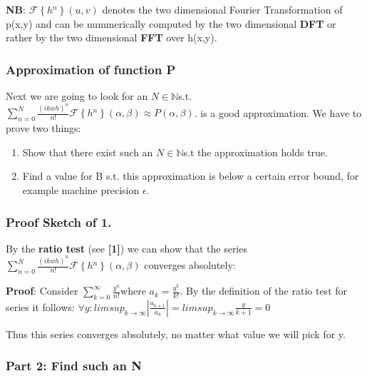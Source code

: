 \textbf{NB}: $\mathcal{F}\left\{ h{}^{n}\right\} (u,v)$ denotes the
two dimensional Fourier Transformation of p(x,y) and can be nummerically
computed by the two dimensional \textbf{DFT} or rather by the two
dimensional \textbf{FFT} over h(x,y). 


\subsubsection{Approximation of function P}

Next we are going to look for an $N\mathbb{\in N}$s.t. $\sum_{n=0}^{N}\frac{(ikwh)^{n}}{n!}\mathcal{F}\left\{ h{}^{n}\right\} (\alpha,\beta)\approx P(\alpha,\beta)$.
is a good approximation. We have to prove two things:
\begin{enumerate}
\item Show that there exist such an $N\mathbb{\in N}$s.t the approximation
holds true.
\item Find a value for B s.t. this approximation is below a certain error
bound, for example machine precision $\epsilon$. 
\end{enumerate}

\subsubsection{Proof Sketch of 1.}

By the \textbf{ratio test} (see \textbf{{[}1{]}}) we can show that
the series $\sum_{n=0}^{N}\frac{(ikwh)^{n}}{n!}\mathcal{F}\left\{ h{}^{n}\right\} (\alpha,\beta)$
converges absolutely:

\textbf{Proof}: Consider $\sum_{k=0}^{\infty}\frac{y^{n}}{n!}$where
$a_{k}=\frac{y^{k}}{k!}$. By the definition of the ratio test for
series it follows: $\forall y:$$limsup_{k\rightarrow\infty}|\frac{a_{k+1}}{a_{k}}|=limsup_{k\rightarrow\infty}\frac{y}{k+1}=0$ 

Thus this series converges absolutely, no matter what value we will
pick for y.


\subsubsection{Part 2: Find such an N}

